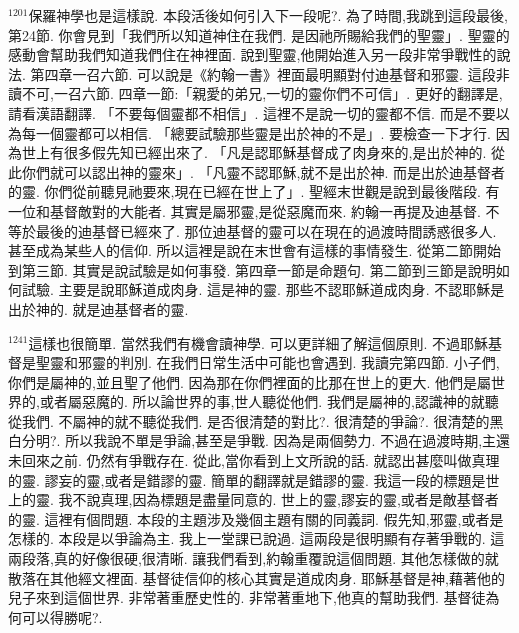 \documentclass{book}
\begin{document}
$^{1201}$保羅神學也是這樣說.
本段活後如何引入下一段呢?.
為了時間,我跳到這段最後,第24節.
你會見到「我們所以知道神住在我們.
是因祂所賜給我們的聖靈」.
聖靈的感動會幫助我們知道我們住在神裡面.
說到聖靈,他開始進入另一段非常爭戰性的說法.
第四章一召六節.
可以說是《約翰一書》裡面最明顯對付迪基督和邪靈.
這段非讀不可,一召六節.
四章一節:「親愛的弟兄,一切的靈你們不可信」.
更好的翻譯是,請看漢語翻譯.
「不要每個靈都不相信」.
這裡不是說一切的靈都不信.
而是不要以為每一個靈都可以相信.
「總要試驗那些靈是出於神的不是」.
要檢查一下才行.
因為世上有很多假先知已經出來了.
「凡是認耶穌基督成了肉身來的,是出於神的.
從此你們就可以認出神的靈來」.
「凡靈不認耶穌,就不是出於神.
而是出於迪基督者的靈.
你們從前聽見祂要來,現在已經在世上了」.
聖經末世觀是說到最後階段.
有一位和基督敵對的大能者.
其實是屬邪靈,是從惡魔而來.
約翰一再提及迪基督.
不等於最後的迪基督已經來了.
那位迪基督的靈可以在現在的過渡時間誘惑很多人.
甚至成為某些人的信仰.
所以這裡是說在末世會有這樣的事情發生.
從第二節開始到第三節.
其實是說試驗是如何事發.
第四章一節是命題句.
第二節到三節是說明如何試驗.
主要是說耶穌道成肉身.
這是神的靈.
那些不認耶穌道成肉身.
不認耶穌是出於神的.
就是迪基督者的靈.

$^{1241}$這樣也很簡單.
當然我們有機會讀神學.
可以更詳細了解這個原則.
不過耶穌基督是聖靈和邪靈的判別.
在我們日常生活中可能也會遇到.
我讀完第四節.
小子們,你們是屬神的,並且聖了他們.
因為那在你們裡面的比那在世上的更大.
他們是屬世界的,或者屬惡魔的.
所以論世界的事,世人聽從他們.
我們是屬神的,認識神的就聽從我們.
不屬神的就不聽從我們.
是否很清楚的對比?.
很清楚的爭論?.
很清楚的黑白分明?.
所以我說不單是爭論,甚至是爭戰.
因為是兩個勢力.
不過在過渡時期,主還未回來之前.
仍然有爭戰存在.
從此,當你看到上文所說的話.
就認出甚麼叫做真理的靈.
謬妄的靈,或者是錯謬的靈.
簡單的翻譯就是錯謬的靈.
我這一段的標題是世上的靈.
我不說真理,因為標題是盡量同意的.
世上的靈,謬妄的靈,或者是敵基督者的靈.
這裡有個問題.
本段的主題涉及幾個主題有關的同義詞.
假先知,邪靈,或者是怎樣的.
本段是以爭論為主.
我上一堂課已說過.
這兩段是很明顯有存著爭戰的.
這兩段落,真的好像很硬,很清晰.
讓我們看到,約翰重覆說這個問題.
其他怎樣做的就散落在其他經文裡面.
基督徒信仰的核心其實是道成肉身.
耶穌基督是神,藉著他的兒子來到這個世界.
非常著重歷史性的.
非常著重地下,他真的幫助我們.
基督徒為何可以得勝呢?.
\end{document}
